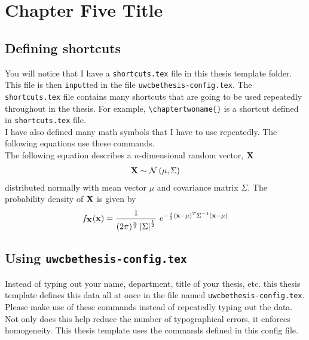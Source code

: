 
\chapter{Chapter Five Title}
\label{chap:chapterfivename}
\doublespacing

\section{Defining shortcuts}
\label{sec:chapterfivename:defining_shortcuts}

You will notice that I have a \texttt{shortcuts.tex} file in this thesis template folder. 
This file is then \texttt{input}ted in the file \texttt{uwcbethesis-config.tex}. 
The \texttt{shortcuts.tex} file contains many shortcuts that are going to be used 
repeatedly throughout in the thesis. For example, \verb+\chaptertwoname{}+ is a 
shortcut defined in \texttt{shortcuts.tex} file. \\

I have also defined many math symbols that I have to use repeatedly. The following 
equations use these commands. \\

The following equation describes a $n$-dimensional random vector, $\mathbf{X}$
\begin{align}
\mathbf{X} \sim \mathcal{N} \left( \mu, \Sigma \right)
\end{align}
distributed normally with mean vector $\mu$ and covariance matrix $\Sigma$. The 
probability density of $\mathbf{X}$ is given by 
\begin{align}
f_{\mathbf{X}}(\mathbf{x}) = \frac{1}{(2\pi)^{\frac{n}{2}} \left| \Sigma \right|^{\frac{1}{2}}}\text{ } e^{-\frac{1}{2} (\mathbf{x}-\mu)^{T} \Sigma^{-1} (\mathbf{x}-\mu)}
\end{align}



\section{Using \texttt{uwcbethesis-config.tex}}
\label{sec:chapterfivename:using_config_file}

Instead of typing out your name, department, title of your thesis, etc. 
this thesis template defines this data all at once in the file named
\texttt{uwcbethesis-config.tex}. Please make use of these commands instead 
of repeatedly typing out the data. Not only does this help reduce the number 
of typographical errors, it enforces homogeneity. This thesis template uses 
the commands defined in this config file. 


